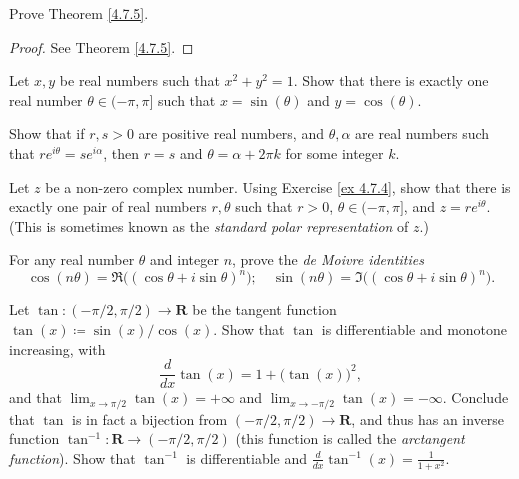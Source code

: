 \begin{exercise}\label{ex 4.7.3}
    Prove Theorem \ref{4.7.5}.
\end{exercise}

\begin{proof}
    See Theorem \ref{4.7.5}.
\end{proof}

\begin{exercise}\label{ex 4.7.4}
    Let \(x, y\) be real numbers such that \(x^2 + y^2 = 1\).
    Show that there is exactly one real number \(\theta \in (-\pi, \pi]\) such that \(x = \sin(\theta)\) and \(y = \cos(\theta)\).
\end{exercise}

\begin{exercise}\label{ex 4.7.5}
    Show that if \(r, s > 0\) are positive real numbers, and \(\theta, \alpha\) are real numbers such that \(r e^{i \theta} = s e^{i \alpha}\), then \(r = s\) and \(\theta = \alpha + 2 \pi k\) for some integer \(k\).
\end{exercise}

\begin{exercise}\label{ex 4.7.6}
    Let \(z\) be a non-zero complex number.
    Using Exercise \ref{ex 4.7.4}, show that there is exactly one pair of real numbers \(r, \theta\) such that \(r > 0\), \(\theta \in (-\pi, \pi]\), and \(z = r e^{i \theta}\).
    (This is sometimes known as the \emph{standard polar representation} of \(z\).)
\end{exercise}

\begin{exercise}\label{ex 4.7.7}
    For any real number \(\theta\) and integer \(n\), prove the \emph{de Moivre identities}
    \[
        \cos(n \theta) = \Re\big((\cos \theta + i \sin \theta)^n\big); \quad \sin(n \theta) = \Im\big((\cos \theta + i \sin \theta)^n\big).
    \]
\end{exercise}

\begin{exercise}\label{ex 4.7.8}
    Let \(\tan : (- \pi / 2, \pi / 2) \to \mathbf{R}\) be the tangent function \(\tan(x) \coloneqq \sin(x) / \cos(x)\).
    Show that \(\tan\) is differentiable and monotone increasing, with
    \[
        \frac{d}{dx} \tan(x) = 1 + \big(\tan(x)\big)^2,
    \]
    and that \(\lim_{x \to \pi / 2} \tan(x) = +\infty\) and \(\lim_{x \to -\pi / 2} \tan(x) = -\infty\).
    Conclude that \(\tan\) is in fact a bijection from \((- \pi / 2, \pi / 2) \to \mathbf{R}\), and thus has an inverse function \(\tan^{-1} : \mathbf{R} \to (- \pi / 2, \pi / 2)\)
    (this function is called the \emph{arctangent function}).
    Show that \(\tan^{-1}\) is differentiable and \(\frac{d}{dx} \tan^{-1}(x) = \frac{1}{1 + x^2}\).
\end{exercise}

